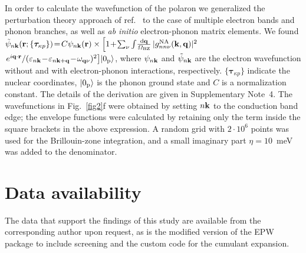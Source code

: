 \documentclass[12pt]{nature}
\def\bk{{\bf k}}
\def\bq{{\bf q}}
\def\ve{\varepsilon}
\begin{document}
In order to calculate the wavefunction of the polaron we generalized the perturbation theory approach 
of ref.~ to the case of multiple electron bands and phonon branches, as well 
as {\it ab initio} electron-phonon matrix elements. We found
$ \tilde{\psi}_{n\bk}(\mathbf r;\{\bm\tau_{\kappa p}\})\!=\!C \psi_{n\bk}({\bf r}) \times\left[1\!+\!
 \sum_{\nu}\int\!\frac{{\rm d}\bq}{\varOmega_{\rm BZ}}\,|g^{\rm NA}_{nn\nu}(\bk,\bq)|^2\right.$ 
 $\left.e^{i\bq\cdot\mathbf r}/(\ve_{n\bk}\!-\!\ve_{n\bk+\bq}\!-\!\omega_{\bq\nu})^2 \right]\!\ket{0_{\rm p}}$, 
where $\psi_{n\bk}$ and $\tilde{\psi}_{n\bk}$ are the electron wavefunction without and with 
electron-phonon interactions, respectively. $\{\bm\tau_{\kappa p}\}$ indicate the nuclear coordinates, 
$\ket{0_{\rm p}}$ is the phonon ground state and $C$ is a normalization constant. The details of the 
derivation are given in Supplementary Note~4. The wavefunctions in Fig.~\ref{fig2}f were obtained by 
setting $n\bk$ to the conduction band edge; the envelope functions were calculated by retaining only 
the term inside the square brackets in the above expression. A random grid with $2\cdot10^6$ points 
was used for the Brillouin-zone integration, and a small imaginary part $\eta=10$~meV was added to 
the denominator.

\section*{\textsf{\small Data availability}} \vspace*{-10pt}
The data that support the findings of this study are available from the corresponding author upon request, 
as is the modified version of the EPW package to include screening and the custom code for the 
cumulant expansion.


\vspace{0.5cm}
\end{document}

